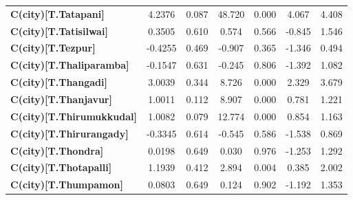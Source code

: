\begin{center}
\begin{tabular}{lcccccc}
\textbf{C(city)[T.Tatapani]}                                                                        &       4.2376  &        0.087     &    48.720  &         0.000        &        4.067    &        4.408     \\
\textbf{C(city)[T.Tatisilwai]}                                                                      &       0.3505  &        0.610     &     0.574  &         0.566        &       -0.845    &        1.546     \\
\textbf{C(city)[T.Tezpur]}                                                                          &      -0.4255  &        0.469     &    -0.907  &         0.365        &       -1.346    &        0.494     \\
\textbf{C(city)[T.Thaliparamba]}                                                                    &      -0.1547  &        0.631     &    -0.245  &         0.806        &       -1.392    &        1.082     \\
\textbf{C(city)[T.Thangadi]}                                                                        &       3.0039  &        0.344     &     8.726  &         0.000        &        2.329    &        3.679     \\
\textbf{C(city)[T.Thanjavur]}                                                                       &       1.0011  &        0.112     &     8.907  &         0.000        &        0.781    &        1.221     \\
\textbf{C(city)[T.Thirumukkudal]}                                                                   &       1.0082  &        0.079     &    12.774  &         0.000        &        0.854    &        1.163     \\
\textbf{C(city)[T.Thirurangady]}                                                                    &      -0.3345  &        0.614     &    -0.545  &         0.586        &       -1.538    &        0.869     \\
\textbf{C(city)[T.Thondra]}                                                                         &       0.0198  &        0.649     &     0.030  &         0.976        &       -1.253    &        1.292     \\
\textbf{C(city)[T.Thotapalli]}                                                                      &       1.1939  &        0.412     &     2.894  &         0.004        &        0.385    &        2.002     \\
\textbf{C(city)[T.Thumpamon]}                                                                       &       0.0803  &        0.649     &     0.124  &         0.902        &       -1.192    &        1.353     \\

\end{tabular}
\end{center}
